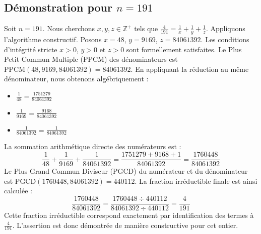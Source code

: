 \documentclass[11pt,a4paper]{article}
\begin{document}
\subsection{Démonstration pour $n = 191$}
Soit $n = 191$. Nous cherchons $x, y, z \in \mathbb{Z}^{+}$ tels que $\frac{4}{191} = \frac{1}{x} + \frac{1}{y} + \frac{1}{z}$.
Appliquons l'algorithme constructif. Posons $x = 48$, $y = 9169$, $z = 84061392$.
Les conditions d'intégrité stricte $x > 0$, $y > 0$ et $z > 0$ sont formellement satisfaites.
Le Plus Petit Commun Multiple (PPCM) des dénominateurs est $\text{PPCM}(48, 9169, 84061392) = 84061392$.
En appliquant la réduction au même dénominateur, nous obtenons algébriquement :
\begin{itemize}
    \item $\frac{1}{48} = \frac{1751279}{84061392}$
    \item $\frac{1}{9169} = \frac{9168}{84061392}$
    \item $\frac{1}{84061392} = \frac{1}{84061392}$
\end{itemize}
La sommation arithmétique directe des numérateurs est :
$$ \frac{1}{48} + \frac{1}{9169} + \frac{1}{84061392} = \frac{1751279 + 9168 + 1}{84061392} = \frac{1760448}{84061392} $$
Le Plus Grand Commun Diviseur (PGCD) du numérateur et du dénominateur est $\text{PGCD}(1760448, 84061392) = 440112$.
La fraction irréductible finale est ainsi calculée :
$$ \frac{1760448}{84061392} = \frac{1760448 \div 440112}{84061392 \div 440112} = \frac{4}{191} $$
Cette fraction irréductible correspond exactement par identification des termes à $\frac{4}{191}$. L'assertion est donc démontrée de manière constructive pour cet entier.
\end{document}
